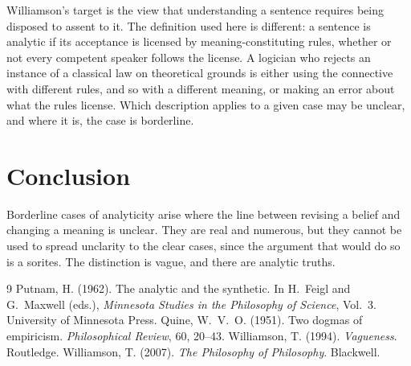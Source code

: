 \documentclass{situationist-preprint}
\begin{document}
\begin{reply}
Williamson's target is the view that understanding a sentence requires being disposed to assent to it. The definition used here is different: a sentence is analytic if its acceptance is licensed by meaning-constituting rules, whether or not every competent speaker follows the license. A logician who rejects an instance of a classical law on theoretical grounds is either using the connective with different rules, and so with a different meaning, or making an error about what the rules license. Which description applies to a given case may be unclear, and where it is, the case is borderline.
\end{reply}

\section{Conclusion}

Borderline cases of analyticity arise where the line between revising a belief and changing a meaning is unclear. They are real and numerous, but they cannot be used to spread unclarity to the clear cases, since the argument that would do so is a sorites. The distinction is vague, and there are analytic truths.

\begin{thebibliography}{9}\small
{} Putnam, H. (1962). The analytic and the synthetic. In H.~Feigl and G.~Maxwell (eds.), \emph{Minnesota Studies in the Philosophy of Science}, Vol.~3. University of Minnesota Press.
 Quine, W.~V.~O. (1951). Two dogmas of empiricism. \emph{Philosophical Review}, 60, 20--43.
 Williamson, T. (1994). \emph{Vagueness}. Routledge.
 Williamson, T. (2007). \emph{The Philosophy of Philosophy}. Blackwell.
\end{thebibliography}
\end{document}
